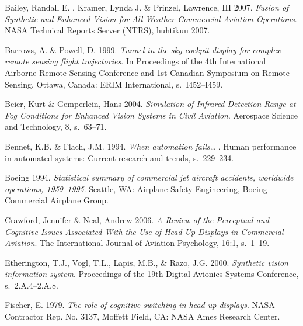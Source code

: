 \documentclass[utf8,bachelor,manualbib]{gradu3}
\begin{document}
\begin{thebibliography}{}

Bailey, Randall E. , Kramer, Lynda J. \& Prinzel, Lawrence, III 2007.
\textit{Fusion of Synthetic and Enhanced Vision for All-Weather Commercial Aviation Operations}.
NASA Technical Reports Server (NTRS), huhtikuu 2007.

Barrows, A. \& Powell, D. 1999.
\textit{Tunnel-in-the-sky cockpit display for complex remote sensing flight
trajectories}.
In Proceedings of the 4th International Airborne Remote Sensing Conference and 1st
Canadian Symposium on Remote Sensing, Ottawa, Canada: ERIM International, s.~I452--I459.

Beier, Kurt \& Gemperlein, Hans 2004.
\textit{Simulation of Infrared Detection Range at Fog Conditions for Enhanced Vision Systems in Civil Aviation}.
Aerospace Science and Technology, 8, s.~63--71.

Bennet, K.B. \& Flach, J.M. 1994.
\textit{When automation fails… }.
Human performance in automated systems: Current research and trends, s.~229--234.

Boeing 1994.
\textit{Statistical summary of commercial jet aircraft accidents, worldwide operations, 1959–1995}.
Seattle, WA: Airplane Safety Engineering, Boeing Commercial Airplane Group.

Crawford, Jennifer \& Neal, Andrew 2006.
\textit{A Review of the Perceptual and Cognitive Issues Associated With the Use of Head-Up Displays in Commercial Aviation}.
The International Journal of Aviation Psychology, 16:1, s.~1--19.

Etherington, T.J., Vogl, T.L., Lapis, M.B., \& Razo, J.G. 2000.
\textit{Synthetic vision information system}.
Proceedings of the 19th Digital Avionics Systems Conference, s.~2.A.4--2.A.8.

Fischer, E. 1979.
\textit{The role of cognitive switching in head-up displays}.
NASA Contractor Rep. No. 3137, Moffett Field, CA: NASA Ames Research Center.


\end{thebibliography}
\end{document}
